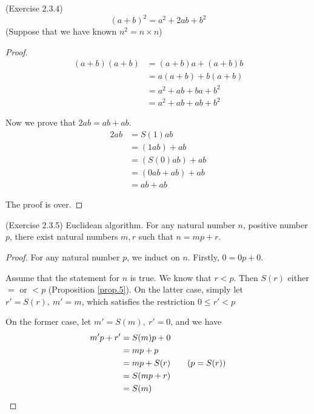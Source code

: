 \begin{prop}
(Exercise 2.3.4) \label{exercise2.3.4}
\[
(a+b)^2=a^2+2ab+b^2
\]
(Suppose that we have known $n^2=n \times n$)
\end{prop}
\begin{proof}
\begin{align*}
(a+b)(a+b) 
&= (a+b)a+(a+b)b \tag{Distribution law} \\
&= a(a+b) + b(a+b) \tag{Commutativity} \\
&= a^2+ab+ba+b^2 \tag{Distribution law} \\
&= a^2+ab+ab+b^2 \tag{Commutativity}
\end{align*}

Now we prove that $2ab = ab+ab$.
\begin{align*}
2ab
&=S(1)ab \\
&=(1ab)+ab\\
&=(S(0)ab)+ab\\
&=(0ab+ab)+ab\\
&=ab+ab
\end{align*}

The proof is over. \qedhere
\end{proof}

\begin{prop}
(Exercise 2.3.5) \label{exercise2.3.5}
Euclidean algorithm. For any natural number $n$, positive number $p$, there exist natural numbers $m,r$ 
such that $n=mp+r$.
\end{prop}
\begin{proof}
For any natural number $p$, we induct on $n$. Firstly, $0=0p+0$. 

Assume that the statement for $n$ is true. We know that $r<p$. Then $S(r)$ either $=$ or $<p$ 
(Proposition \ref{prop.5}). On the latter case, simply let $r'=S(r),\ m'=m$, which satisfies the 
restriction $0\leq r' <p$ 

On the former case, let $m'=S(m),\ r'=0$, and we have
\begin{align*}
m'p+r'
&= S(m)p+0\\
&= mp + p\\
&= mp + S(r) \tag{$p=S(r)$}\\
&= S(mp+r)\\
&= S(m) \qedhere
\end{align*}
\end{proof}